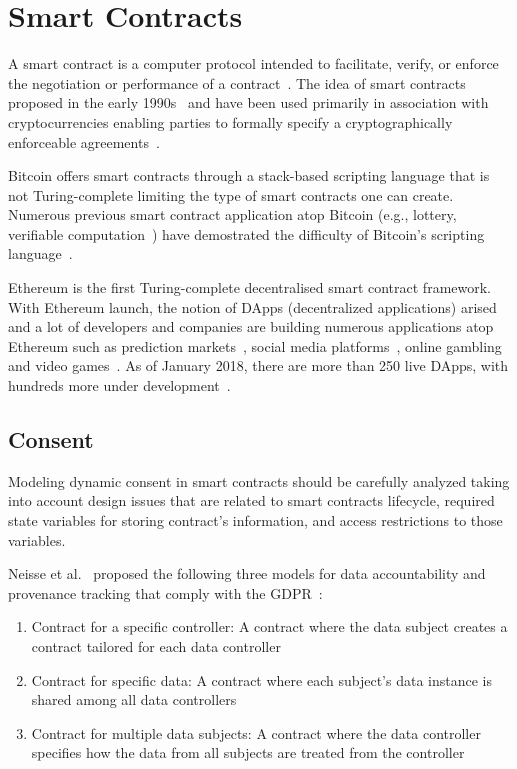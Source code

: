 \chapter{Smart Contracts}
\label{smart_contracts}

A smart contract is a computer protocol intended to facilitate, verify, or enforce the negotiation or performance of a contract~\cite{FM548,wiki:smart_contract}.
The idea of smart contracts proposed in the early 1990s~\cite{FM548} and have been used primarily in association with cryptocurrencies enabling
parties to formally specify a cryptographically enforceable agreements~\cite{7163021}.

Bitcoin offers smart contracts through a stack-based scripting language that is not Turing-complete limiting the type of smart contracts one can create.
Numerous previous smart contract application atop Bitcoin (e.g., lottery\cite{Andrychowicz:2014:SMC:2650286.2650764,10.1007/978-3-662-44381-1_24},
verifiable computation~\cite{Kumaresan:2014:UBI:2660267.2660380}) have demostrated the difficulty of Bitcoin's scripting language~\cite{cryptoeprint:2015:675}.

Ethereum is the first Turing-complete decentralised smart contract framework. With Ethereum launch, the notion of DApps (decentralized applications) arised
and a lot of developers and companies are building numerous applications atop Ethereum such as prediction markets~\cite{augur,gnosis}, social media platforms~\cite{akasha,backfeed},
online gambling~\cite{etheroll,coinpoker} and video games~\cite{cryptokitties}. As of January 2018, there are more than 250 live DApps,
with hundreds more under development~\cite{wiki:ethereum}.

\section{Consent}
\label{smart_contract:consent}

Modeling dynamic consent in smart contracts should be carefully analyzed taking into account design issues that are related to smart contracts lifecycle, required state variables for storing contract’s information, and access restrictions to those variables.

Neisse et al.~\cite{DBLP:journals/corr/NeisseSF17} proposed the following three models for data accountability and provenance tracking that comply with the GDPR~\cite{gdpr}:

\begin{enumerate}
  \item Contract for a specific controller: A contract where the data subject creates a contract tailored for each data controller
  \item Contract for specific data: A contract where each subject’s data instance is shared among all data controllers
  \item Contract for multiple data subjects: A contract where the data controller specifies how the data from all subjects are treated from the controller
\end{enumerate}

